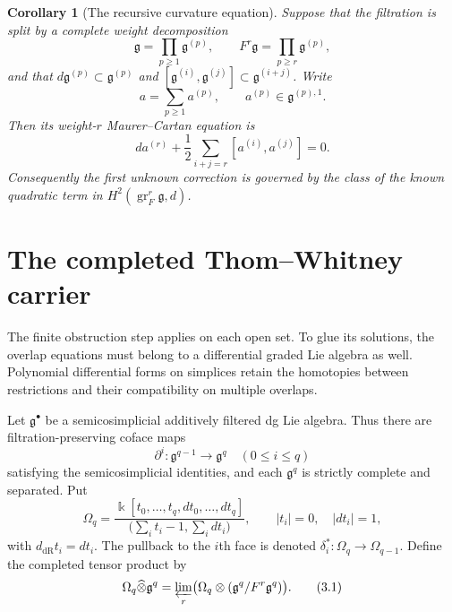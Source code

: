 \documentclass[11pt]{article}
\newtheorem{corollary}[theorem]{Corollary}
\theoremstyle{definition}
\theoremstyle{remark}
\newcommand{\gr}{\operatorname{gr}}
\begin{document}
\begin{corollary}[The recursive curvature equation]\label{cor:weights}
Suppose that the filtration is split by a complete weight decomposition
\[
 \mathfrak g=\prod_{p\geq1}\mathfrak g^{(p)},
 \qquad
 F^r\mathfrak g=\prod_{p\geq r}\mathfrak g^{(p)},
\]
and that $d\mathfrak g^{(p)}\subset\mathfrak g^{(p)}$ and
$[\mathfrak g^{(i)},\mathfrak g^{(j)}]
\subset\mathfrak g^{(i+j)}$.  Write
\[
 a=\sum_{p\geq1}a^{(p)},
 \qquad a^{(p)}\in \mathfrak g^{(p),1}.
\]
Then its weight-$r$ Maurer--Cartan equation is
\[
 da^{(r)}+\frac12
 \sum_{i+j=r}[a^{(i)},a^{(j)}]=0.
 \tag{2.8}\label{eq:weight-equation-dgla}
\]
Consequently the first unknown correction is governed by the class of the
known quadratic term in $H^2(\gr_F^r\mathfrak g,d)$.
\end{corollary}

\section{The completed Thom--Whitney carrier}

The finite obstruction step applies on each open set.  To glue its solutions,
the overlap equations must belong to a differential graded Lie algebra as
well.  Polynomial differential forms on simplices retain the homotopies
between restrictions and their compatibility on multiple overlaps.

Let $\mathfrak g^\bullet$ be a semicosimplicial additively filtered dg Lie
algebra.  Thus there are filtration-preserving coface maps
\[
 \partial^i:\mathfrak g^{q-1}\longrightarrow\mathfrak g^q
 \quad (0\leq i\leq q)
\]
satisfying the semicosimplicial identities, and each $\mathfrak g^q$ is
strictly complete and separated.  Put
\[
 \Omega_q=
 \frac{\Bbbk[t_0,\ldots,t_q,dt_0,\ldots,dt_q]}
 {\bigl(\sum_i t_i-1,\sum_i dt_i\bigr)},
 \qquad |t_i|=0,\quad |dt_i|=1,
\]
with $d_{\mathrm{dR}}t_i=dt_i$.  The pullback to the $i$th face is denoted
$\delta_i^*:\Omega_q\to\Omega_{q-1}$.  Define the completed tensor product
by
\[
 \Omega_q\widehat\otimes\mathfrak g^q
 =\varprojlim_r
 \bigl(\Omega_q\otimes(\mathfrak g^q/F^r\mathfrak g^q)\bigr).
 \tag{3.1}\label{eq:completed-tensor}
\]
\end{document}
